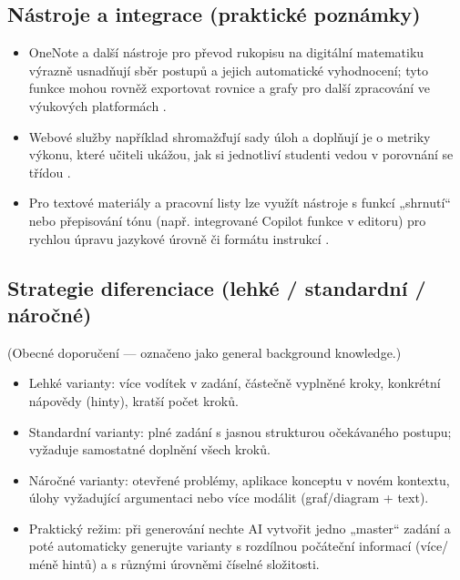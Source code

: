 \documentclass{report}%
\begin{document}
\subsection*{Nástroje a integrace (praktické poznámky)}
\begin{itemize}
  \item OneNote a další nástroje pro převod rukopisu na digitální matematiku výrazně usnadňují sběr postupů a jejich automatické vyhodnocení; tyto funkce mohou rovněž exportovat rovnice a grafy pro další zpracování ve výukových platformách \cite{kb_ai_101_tipu_pdf_04e4a115_page_8_1}.
  \item Webové služby například shromažďují sady úloh a doplňují je o metriky výkonu, které učiteli ukážou, jak si jednotliví studenti vedou v porovnání se třídou \cite{kb_ai_101_tipu_pdf_04e4a115_page_8_1}.
  \item Pro textové materiály a pracovní listy lze využít nástroje s funkcí „shrnutí“ nebo přepisování tónu (např. integrované Copilot funkce v editoru) pro rychlou úpravu jazykové úrovně či formátu instrukcí \cite{kb_ai_101_tipu_pdf_04e4a115_page_14_1}.
\end{itemize}

\subsection*{Strategie diferenciace (lehké / standardní / náročné)}
(Obecné doporučení — označeno jako general background knowledge.)
\begin{itemize}
  \item Lehké varianty: více vodítek v zadání, částečně vyplněné kroky, konkrétní nápovědy (hinty), kratší počet kroků.
  \item Standardní varianty: plné zadání s jasnou strukturou očekávaného postupu; vyžaduje samostatné doplnění všech kroků.
  \item Náročné varianty: otevřené problémy, aplikace konceptu v novém kontextu, úlohy vyžadující argumentaci nebo více mo­dálit (graf/diagram + text).
  \item Praktický režim: při generování nechte AI vytvořit jedno „master“ zadání a poté automaticky generujte varianty s rozdílnou počáteční informací (více/ méně hintů) a s různými úrovněmi číselné složitosti.
\end{itemize}
\end{document}

